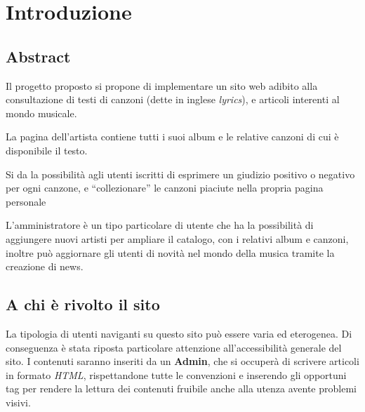 \section{Introduzione}

\subsection{Abstract}
Il progetto proposto si propone di implementare un sito web adibito alla consultazione di testi di canzoni (dette in inglese \textit{lyrics}), e articoli interenti al mondo musicale.

La pagina dell'artista contiene tutti i suoi album e le relative canzoni di cui è disponibile il testo.

Si da la possibilità agli utenti iscritti di esprimere un giudizio positivo o negativo per ogni canzone, e ``collezionare'' le canzoni piaciute nella propria pagina personale

L'amministratore è un tipo particolare di utente che ha la possibilità di aggiungere nuovi artisti per ampliare il catalogo, con i relativi album e canzoni, inoltre può aggiornare gli utenti di novità nel mondo della musica tramite la creazione di news.


\subsection{A chi è rivolto il sito}
La tipologia di utenti naviganti su questo sito può essere varia ed eterogenea. Di conseguenza è stata riposta particolare attenzione all'accessibilità generale del sito. I contenuti saranno inseriti da un \textbf{Admin}, che si occuperà di scrivere articoli in formato \textit{HTML}, rispettandone tutte le convenzioni e inserendo gli opportuni tag per rendere la lettura dei contenuti fruibile anche alla utenza avente problemi visivi.

